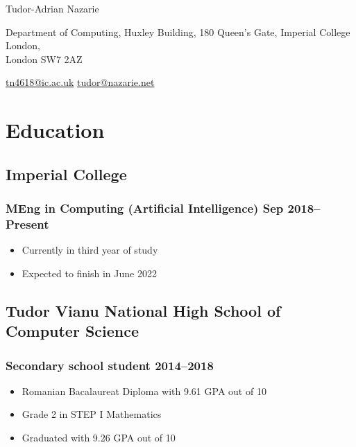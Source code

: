 \documentclass[a4paper]{article}
\begin{document}
\begin{center}
	{\huge\sffamily Tudor-Adrian Nazarie}

	\vspace{4pt}

	Department of Computing, Huxley Building, 180 Queen's Gate, Imperial
	College London,\\ London SW7 2AZ

	\vspace{4pt}

	\href{mailto:tn4618@ic.ac.uk}{tn4618@ic.ac.uk}
	\href{mailto:tudor@nazarie.net}{tudor@nazarie.net}


	\vspace{-12pt}
\end{center}

\section*{Education}
\subsection*{Imperial College}
\subsubsection*{MEng in Computing (Artificial Intelligence) \hfill Sep 2018--Present}
\begin{itemize}
	\item Currently in third year of study
	\item Expected to finish in June 2022
\end{itemize}

\subsection*{Tudor Vianu National High School of Computer Science}
\subsubsection*{Secondary school student \hfill 2014--2018}
\begin{itemize}
	\item Romanian Bacalaureat Diploma with 9.61 GPA out of 10
	\item Grade 2 in STEP I Mathematics
	\item Graduated with 9.26 GPA out of 10
\end{itemize}
\end{document}
